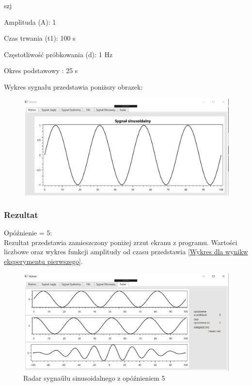 \documentclass[12pt]{article}
\begin{document}
\begin{labeling}{szj}
\item [Amplituda (A):] 1
\item [Czas trwania (t1):] 100 s
\item [Częstotliwość próbkowania (d): ] 1 Hz
\item [Okres podstawowy :] 25 s
\end{labeling}

Wykres sygnału przedstawia poniższy obrazek:
\newpage
\begin{figure}[h!]
 \centering
 \includegraphics[width=12.3cm]{sin1.PNG}
 \vspace{-0.3cm}
 \label{gw}
\end{figure}
\subsubsection{Rezultat}

Opóźnienie = 5:
\\Rezultat przedstawia zamieszczony poniżej zrzut ekranu z programu. Wartości liczbowe oraz wykres funkcji amplitudy od czasu przedstawia \ref{Wykres dla wynikw eksperymentu pierwszego}.
\begin{figure}[h!]
 \centering
 \includegraphics[width=12.3cm]{sin1R5.PNG}
 \vspace{-0.3cm}
 \caption{Radar sygnaűłu sinusoidalnego z opóźnieniem 5}
 \label{R5}
\end{figure}
\end{document}
